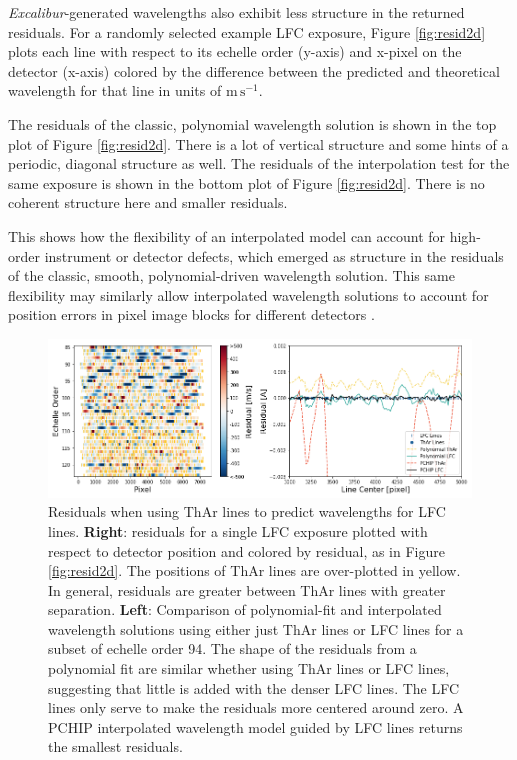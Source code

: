 \documentclass[modern]{aastex63}
\newcommand{\project}[1]{\textsl{#1}}
\newcommand{\Name}{\project{Excalibur}}
\newcommand{\mps}{\mathrm{m\,s^{-1}}}
\begin{document}
\Name -generated wavelengths also exhibit less structure in the returned residuals.  For a randomly selected example LFC exposure, Figure \ref{fig:resid2d} plots each line with respect to its echelle order (y-axis) and x-pixel on the detector (x-axis) colored by the difference between the predicted and theoretical wavelength for that line in units of $\mps$.

The residuals of the classic, polynomial wavelength solution is shown in the top plot of Figure \ref{fig:resid2d}.  There is a lot of vertical structure and some hints of a periodic, diagonal structure as well.  The residuals of the interpolation test for the same exposure is shown in the bottom plot of Figure \ref{fig:resid2d}.  There is no coherent structure here and smaller residuals.

This shows how the flexibility of an interpolated model can account for high-order instrument or detector defects, which emerged as structure in the residuals of the classic, smooth, polynomial-driven wavelength solution.  This same flexibility may similarly allow interpolated wavelength solutions to account for position errors in pixel image blocks for different detectors \citep{fischer2016, milakovic2020}.

\begin{figure}[t]
\centering
\includegraphics[width=\textwidth]{Figures/lineDensity.png}
\caption{Residuals when using ThAr lines to predict wavelengths for LFC lines.  \textbf{Right}: residuals for a single LFC exposure plotted with respect to detector position and colored by residual, as in Figure \ref{fig:resid2d}.  The positions of ThAr lines are over-plotted in yellow.  In general, residuals are greater between ThAr lines with greater separation.
\textbf{Left}: Comparison of polynomial-fit and interpolated wavelength solutions using either just ThAr lines or LFC lines for a subset of echelle order 94.  The shape of the residuals from a polynomial fit are similar whether using ThAr lines or LFC lines, suggesting that little is added with the denser LFC lines.  The LFC lines only serve to make the residuals more centered around zero.  A PCHIP interpolated wavelength model guided by LFC lines returns the smallest residuals.}
\label{fig:waveResids}
\end{figure} 
\end{document}
